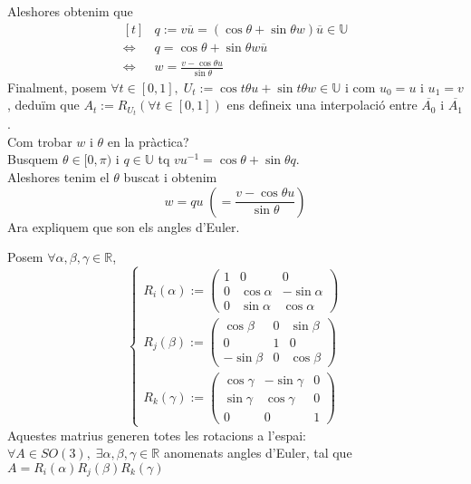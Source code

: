 \documentclass[a4paper,12pt]{article}
\begin{document}
	Aleshores obtenim que
	\begin{displaymath}
		\begin{aligned}[t]
			&q := v\overline{u} = (\cos{\theta} + \sin{\theta}w)\overline{u} \in \mathbb{U}\\
			\iff & q = \cos{\theta} + \sin{\theta}w\overline{u}\\
			\iff & w = \frac{v - \cos{\theta}u}{\sin{\theta}}
		\end{aligned}
	\end{displaymath}
	Finalment, posem $\forall t \in [0,1],\;U_t := \cos{t\theta}u + \sin{t\theta}w \in \mathbb{U}$ i com $u_0 = u$ i $u_1 = v$, deduïm que $A_t := R_{U_t} (\forall t \in [0,1])$ ens defineix una interpolació entre $\overline{A_0}$ i $\overline{A_1}$.\\
	Com trobar $w$ i $\theta$ en la pràctica?\\
	Busquem $\theta \in [0, \pi)$ i $q \in \mathbb{U}$ tq $vu^{-1} = \cos{\theta} + \sin{\theta}q$.\\
	Aleshores tenim el $\theta$ buscat i obtenim
	\begin{displaymath}
		w = qu\;(= \frac{v - \cos{\theta}u}{\sin{\theta}})
	\end{displaymath}
	Ara expliquem que son els angles d'Euler.\\
	\begin{teorema}
		Posem $\forall \alpha, \beta, \gamma \in \mathbb{R}$,
		\begin{displaymath}
			\begin{cases}
				R_{i}(\alpha) :=\begin{pmatrix}
					1 & 0 & 0\\
					0 & \cos{\alpha} & -\sin{\alpha}\\
					0 & \sin{\alpha} & \cos{\alpha}
				\end{pmatrix}\\
				R_{j}(\beta) :=\begin{pmatrix}
					\cos{\beta} & 0 & \sin{\beta}\\
					0 & 1 & 0\\
					-\sin{\beta} & 0 & \cos{\beta}
				\end{pmatrix}\\
				R_{k}(\gamma) :=\begin{pmatrix}
					\cos{\gamma} & -\sin{\gamma} & 0\\
					\sin{\gamma} & \cos{\gamma} & 0\\
					0 & 0 & 1
				\end{pmatrix}
			\end{cases}
		\end{displaymath}
		Aquestes matrius generen totes les rotacions a l'espai:\\
		$\forall A \in SO(3),\; \exists \alpha, \beta, \gamma \in \mathbb{R}$
		anomenats angles d'Euler, tal que\\
		$A = R_{i}(\alpha)R_{j}(\beta)R_{k}(\gamma)$
	\end{teorema}
\end{document}
